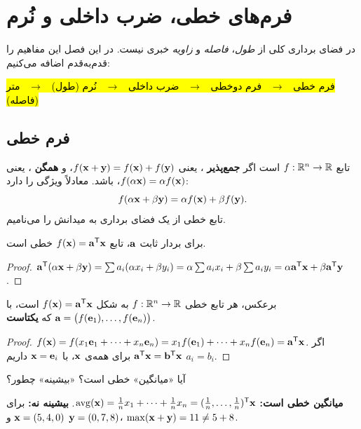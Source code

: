 \chapter{فرم‌های خطی، ضرب داخلی و نُرم}
\label{ch:inner-product}

در فضای برداری  کلی از \emph{طول}، \emph{فاصله} و \emph{زاویه} خبری نیست. در این فصل این مفاهیم را قدم‌به‌قدم اضافه می‌کنیم:
\begin{center}
\hl{فرم خطی \ $\to$ \ فرم دوخطی \ $\to$ \ ضرب داخلی \ $\to$ \ نُرم (طول) \ $\to$ \ متر (فاصله)}
\end{center}

\section{فرم خطی}

\begin{definition}
تابع $f:\mathbb{R}^n\to\mathbb{R}$  است اگر \textbf{جمع‌پذیر} ، یعنی $f(\mathbf{x}+\mathbf{y})=f(\mathbf{x})+f(\mathbf{y})$، و \textbf{همگن } ، یعنی $f(\alpha\mathbf{x})=\alpha f(\mathbf{x})$، باشد. معادلاً ویژگی  را دارد:
\[
f(\alpha\mathbf{x}+\beta\mathbf{y})=\alpha f(\mathbf{x})+\beta f(\mathbf{y}).
\]
تابع خطی از یک فضای برداری به میدانش را  می‌نامیم.
\end{definition}

\begin{theorem}\label{thm:inner-is-linear}
برای بردار ثابت $\mathbf{a}$، تابع $f(\mathbf{x})=\mathbf{a}^{\mathsf{T}}\mathbf{x}$ خطی است.
\end{theorem}
\begin{proof}
$\mathbf{a}^{\mathsf{T}}(\alpha\mathbf{x}+\beta\mathbf{y})=\sum a_i(\alpha x_i+\beta y_i)=\alpha\sum a_ix_i+\beta\sum a_iy_i=\alpha\mathbf{a}^{\mathsf{T}}\mathbf{x}+\beta\mathbf{a}^{\mathsf{T}}\mathbf{y}$.
\end{proof}

\begin{theorem}\label{thm:linear-is-inner}
برعکس، هر تابع خطی $f:\mathbb{R}^n\to\mathbb{R}$ به شکل $f(\mathbf{x})=\mathbf{a}^{\mathsf{T}}\mathbf{x}$ است، با $\mathbf{a}=\big(f(\mathbf{e}_1),\dots,f(\mathbf{e}_n)\big)$ که \textbf{یکتاست}.
\end{theorem}
\begin{proof}
$f(\mathbf{x})=f(x_1\mathbf{e}_1+\dots+x_n\mathbf{e}_n)=x_1f(\mathbf{e}_1)+\dots+x_nf(\mathbf{e}_n)=\mathbf{a}^{\mathsf{T}}\mathbf{x}$. اگر $\mathbf{a}^{\mathsf{T}}\mathbf{x}=\mathbf{b}^{\mathsf{T}}\mathbf{x}$ برای همه‌ی $\mathbf{x}$، با $\mathbf{x}=\mathbf{e}_i$ داریم $a_i=b_i$.
\end{proof}

\begin{example}
آیا «میانگین» خطی است؟ «بیشینه» چطور؟
\end{example}
\begin{solution}
\textbf{میانگین خطی است:} $\operatorname{avg}(\mathbf{x})=\frac1nx_1+\dots+\frac1nx_n=(\frac1n,\dots,\frac1n)^{\mathsf{T}}\mathbf{x}$.
\textbf{بیشینه نه:} برای $\mathbf{x}=(5,4,0)$ و $\mathbf{y}=(0,7,8)$، $\max(\mathbf{x}+\mathbf{y})=11\neq5+8$.
\end{solution}

